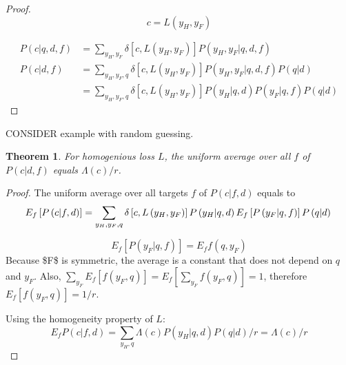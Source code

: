 \documentclass[a4paper]{article}
\newtheorem{theorem}{Theorem}[section]
\begin{document}
\begin{proof}
\begin{equation}
  c = L\left(y_H, y_F\right)
\end{equation}

\begin{equation}
\begin{split}
  P\left(c|q,d,f\right)& = \sum_{y_H,y_F} \delta\left[c,L\left(y_H,
      y_F\right)\right] P\left(y_H, y_F| q,d,f\right) \\
  P\left(c|d,f\right) & = \sum_{y_H,y_F,q} \delta\left[c,L\left(y_H,
      y_F\right)\right] P\left(y_H, y_F|q, d,f\right) P\left(q|d\right) \\
  & = \sum_{y_H,y_F,q} \delta\left[c,L\left(y_H, y_F\right)\right]
  P\left(y_H|q,d\right) P\left(y_F|q,f\right) P\left(q|d\right)
\end{split}
\end{equation}
\end{proof}
CONSIDER example with random guessing.

\begin{theorem}
  For homogenious loss $L$, the uniform average over all $f$ of
  $P\left(c|d,f\right)$ equals $\Lambda\left(c\right)/r$.
  \label{th:Pcdf}
\end{theorem}

\begin{proof}
  The uniform average over all targets $f$ of $P\left(c|f,d\right)$
  equals to
  \begin{equation}
    E_f \left[P\left(c|f,d\right)\right] = \sum_{y_H,y_F,q}
      \delta\left[c,L\left(y_H, y_F\right)\right]
      P\left(y_H|q,d\right) E_f \left[P\left(y_F|q,f\right)\right] P\left(q|d\right) \\
  \end{equation}

  \begin{equation}
    E_f \left[P\left(y_F|q,f\right)\right] = E_f f(q,y_F)
  \end{equation}
  Because \gls{$F$} is symmetric, the average is a constant that does
  not depend on $q$ and $y_F$. Also,
  $\sum_{y_F} E_f\left[f(y_F, q)\right] = E_f\left[\sum_{y_F} f(y_F,
    q)\right] = 1$, therefore $E_f\left[f(y_F, q)\right] = 1/r$.

  Using the homogeneity property of $L$:
  \begin{equation}
    E_f P\left(c|f,d\right) = \sum_{y_H, q} \Lambda(c)
    P\left(y_H|q,d\right)  P\left(q|d\right) / r = \Lambda(c)/r
  \end{equation}
\end{proof}
\end{document}
